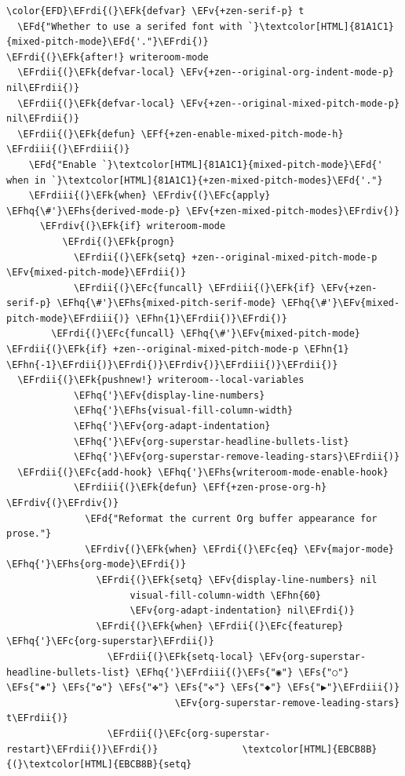 \documentclass{scrartcl}
\newcommand{\EFk}[1]{\textcolor{EFk}{#1}} %
\newcommand{\EFd}[1]{\textcolor{EFd}{#1}} %
\newcommand{\EFs}[1]{\textcolor{EFs}{#1}} %
\newcommand{\EFc}[1]{\textcolor{EFc}{#1}} %
\newcommand{\EFv}[1]{\textcolor{EFv}{#1}} %
\newcommand{\EFf}[1]{\textcolor{EFf}{#1}} %
\newcommand{\EFhn}[1]{#1} %
\newcommand{\EFhq}[1]{#1} %
\newcommand{\EFhs}[1]{#1} %
\newcommand{\EFrdi}[1]{#1} %
\newcommand{\EFrdii}[1]{#1} %
\newcommand{\EFrdiii}[1]{#1} %
\newcommand{\EFrdiv}[1]{#1} %
\begin{document}
\begin{Code}
\begin{Verbatim}[]
\color{EFD}\EFrdi{(}\EFk{defvar} \EFv{+zen-serif-p} t
  \EFd{"Whether to use a serifed font with `}\textcolor[HTML]{81A1C1}{mixed-pitch-mode}\EFd{'."}\EFrdi{)}
\EFrdi{(}\EFk{after!} writeroom-mode
  \EFrdii{(}\EFk{defvar-local} \EFv{+zen--original-org-indent-mode-p} nil\EFrdii{)}
  \EFrdii{(}\EFk{defvar-local} \EFv{+zen--original-mixed-pitch-mode-p} nil\EFrdii{)}
  \EFrdii{(}\EFk{defun} \EFf{+zen-enable-mixed-pitch-mode-h} \EFrdiii{(}\EFrdiii{)}
    \EFd{"Enable `}\textcolor[HTML]{81A1C1}{mixed-pitch-mode}\EFd{' when in `}\textcolor[HTML]{81A1C1}{+zen-mixed-pitch-modes}\EFd{'."}
    \EFrdiii{(}\EFk{when} \EFrdiv{(}\EFc{apply} \EFhq{\#'}\EFhs{derived-mode-p} \EFv{+zen-mixed-pitch-modes}\EFrdiv{)}
      \EFrdiv{(}\EFk{if} writeroom-mode
          \EFrdi{(}\EFk{progn}
            \EFrdii{(}\EFk{setq} +zen--original-mixed-pitch-mode-p \EFv{mixed-pitch-mode}\EFrdii{)}
            \EFrdii{(}\EFc{funcall} \EFrdiii{(}\EFk{if} \EFv{+zen-serif-p} \EFhq{\#'}\EFhs{mixed-pitch-serif-mode} \EFhq{\#'}\EFv{mixed-pitch-mode}\EFrdiii{)} \EFhn{1}\EFrdii{)}\EFrdi{)}
        \EFrdi{(}\EFc{funcall} \EFhq{\#'}\EFv{mixed-pitch-mode} \EFrdii{(}\EFk{if} +zen--original-mixed-pitch-mode-p \EFhn{1} \EFhn{-1}\EFrdii{)}\EFrdi{)}\EFrdiv{)}\EFrdiii{)}\EFrdii{)}
  \EFrdii{(}\EFk{pushnew!} writeroom--local-variables
            \EFhq{'}\EFv{display-line-numbers}
            \EFhq{'}\EFhs{visual-fill-column-width}
            \EFhq{'}\EFv{org-adapt-indentation}
            \EFhq{'}\EFv{org-superstar-headline-bullets-list}
            \EFhq{'}\EFv{org-superstar-remove-leading-stars}\EFrdii{)}
  \EFrdii{(}\EFc{add-hook} \EFhq{'}\EFhs{writeroom-mode-enable-hook}
            \EFrdiii{(}\EFk{defun} \EFf{+zen-prose-org-h} \EFrdiv{(}\EFrdiv{)}
              \EFd{"Reformat the current Org buffer appearance for prose."}
              \EFrdiv{(}\EFk{when} \EFrdi{(}\EFc{eq} \EFv{major-mode} \EFhq{'}\EFhs{org-mode}\EFrdi{)}
                \EFrdi{(}\EFk{setq} \EFv{display-line-numbers} nil
                      visual-fill-column-width \EFhn{60}
                      \EFv{org-adapt-indentation} nil\EFrdi{)}
                \EFrdi{(}\EFk{when} \EFrdii{(}\EFc{featurep} \EFhq{'}\EFc{org-superstar}\EFrdii{)}
                  \EFrdii{(}\EFk{setq-local} \EFv{org-superstar-headline-bullets-list} \EFhq{'}\EFrdiii{(}\EFs{"◉"} \EFs{"○"} \EFs{"✸"} \EFs{"✿"} \EFs{"✤"} \EFs{"✜"} \EFs{"◆"} \EFs{"▶"}\EFrdiii{)}
                              \EFv{org-superstar-remove-leading-stars} t\EFrdii{)}
                  \EFrdii{(}\EFc{org-superstar-restart}\EFrdii{)}\EFrdi{)}               \textcolor[HTML]{EBCB8B}{(}\textcolor[HTML]{EBCB8B}{setq}

\end{Verbatim}
\end{Code}
\end{document}
